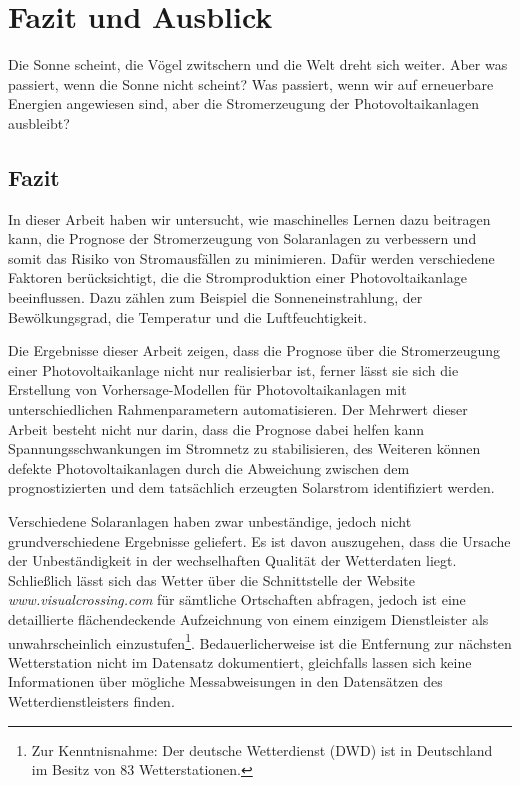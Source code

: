 \documentclass[12pt, a4paper]{article}
\begin{document}
\newpage

\section{Fazit und Ausblick}
\label{sec:conclusion_outlook}

Die Sonne scheint, die Vögel zwitschern und die Welt dreht sich weiter. Aber was passiert, wenn die Sonne nicht scheint? Was passiert, wenn wir auf erneuerbare Energien angewiesen sind, aber die Stromerzeugung der Photovoltaikanlagen ausbleibt? 

\subsection{Fazit}

In dieser Arbeit haben wir untersucht, wie maschinelles Lernen dazu beitragen kann, die Prognose der Stromerzeugung von Solaranlagen zu verbessern und somit das Risiko von Stromausfällen zu minimieren. Dafür werden verschiedene Faktoren berücksichtigt, die die Stromproduktion einer Photovoltaikanlage beeinflussen. Dazu zählen zum Beispiel die Sonneneinstrahlung, der Bewölkungsgrad, die Temperatur und die Luftfeuchtigkeit.

Die Ergebnisse dieser Arbeit zeigen, dass die Prognose über die Stromerzeugung einer Photovoltaikanlage nicht nur realisierbar ist, ferner lässt sie sich die Erstellung von Vorhersage-Modellen für Photovoltaikanlagen mit unterschiedlichen Rahmenparametern automatisieren. Der Mehrwert dieser Arbeit besteht nicht nur darin, dass die Prognose dabei helfen kann Spannungsschwankungen im Stromnetz zu stabilisieren, des Weiteren können defekte Photovoltaikanlagen durch die Abweichung zwischen dem prognostizierten und dem tatsächlich erzeugten Solarstrom identifiziert werden.

Verschiedene Solaranlagen haben zwar unbeständige, jedoch nicht grundverschiedene Ergebnisse geliefert. Es ist davon auszugehen, dass die Ursache der Unbeständigkeit in der wechselhaften Qualität der Wetterdaten liegt. Schließlich lässt sich das Wetter über die Schnittstelle der Website \textit{www.visualcrossing.com} für sämtliche Ortschaften abfragen, jedoch ist eine detaillierte flächendeckende Aufzeichnung von einem einzigem Dienstleister als unwahrscheinlich einzustufen\footnote{Zur Kenntnisnahme: Der deutsche Wetterdienst (DWD) ist in Deutschland im Besitz von 83 Wetterstationen.}. Bedauerlicherweise ist die Entfernung zur nächsten Wetterstation nicht im Datensatz dokumentiert, gleichfalls lassen sich keine Informationen über mögliche Messabweisungen in den Datensätzen des Wetterdienstleisters finden.
\end{document}
